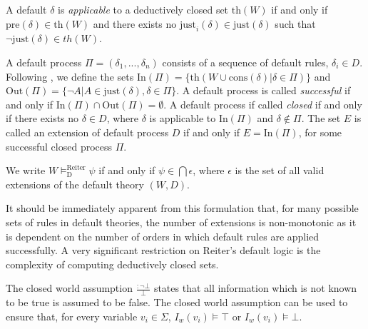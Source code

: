A default $\delta$ is \textit{applicable} to a deductively closed set $\text{th}(W)$ if and only if $\text{pre}(\delta) \in \text{th}(W)$ and there exists no $\text{just}_i(\delta) \in \text{just}(\delta)$ such that $\lnot \text{just}(\delta) \in th(W)$.

A default process $\Pi=(\delta_1,...,\delta_n)$ consists of a sequence of default rules, $\delta_i\in D$. Following \cite{ragni2017formal}, we define the sets $\text{In}(\Pi)=\{\text{th}(W \cup \text{cons}(\delta)|\delta \in \Pi)\}$ and $\text{Out}(\Pi)=\{\lnot A|A \in \text{just}(\delta), \delta \in \Pi\}$. A default process is called \textit{successful} if and only if $\text{In}(\Pi)\cap \text{Out}(\Pi)=\emptyset$. A default process if called \textit{closed} if and only if there exists no $\delta \in D$, where $\delta$ is applicable to $\text{In}(\Pi)$ and $\delta \not\in \Pi$. The set $E$ is called an extension of default process $D$ if and only if $E=\text{In}(\Pi)$, for some successful closed process $\Pi$. 

We write $W\models_\text{D}^\text{Reiter} \psi$ if and only if $\psi \in \bigcap \epsilon$, where $\epsilon$ is the set of all valid extensions of the default theory $(W,D)$.


It should be immediately apparent from this formulation that, for many possible sets of rules in default theories, the number of extensions is non-monotonic as it is dependent on the number of orders in which default rules are applied successfully. A very significant restriction on Reiter's default logic is the complexity of computing deductively closed sets.

The closed world assumption $\frac{: \lnot \bot}{\bot}$ states that all information which is not known to be true is assumed to be false. The closed world assumption can be used to ensure that, for every variable $v_i \in \Sigma$, $I_w(v_i) \models \top$ or $I_w(v_i) \models \bot$.



